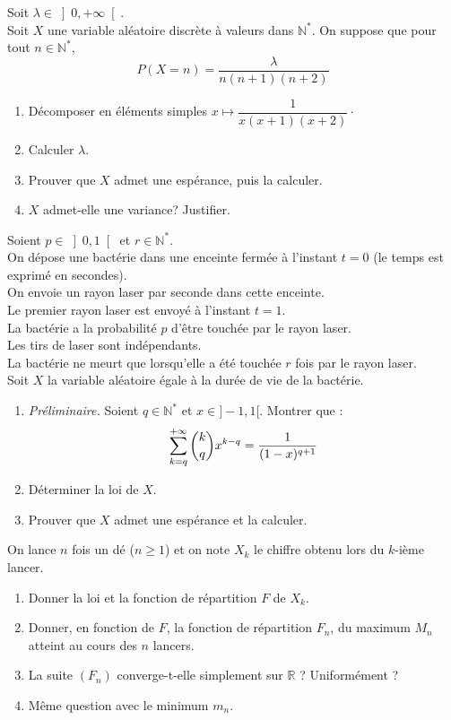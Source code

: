 \documentclass[a4paper,10pt]{report}
\begin{document}
\begin{Exa}Soit $\lambda \in{\left] 0,+\infty\right[ }$.\\
Soit $X$ une variable aléatoire discrète à valeurs dans $\mathbb{N}^\ast$. On suppose que pour tout $n \in \mathbb{N}^*$, 
$$P(X=n)=\dfrac{\lambda}{n(n+1)(n+2)} $$
\begin{enumerate}
\item Décomposer en éléments simples $x \mapsto \dfrac{1}{x(x+1)(x+2)} \cdot$
\item
Calculer $\lambda$.
\item
Prouver que $X$ admet une espérance, puis la calculer.
\item
$X$ admet-elle une variance? Justifier.
\end{enumerate}
\end{Exa}



\begin{Exa} Soient $p\in \left] 0,1\right[$ et $r\in\mathbb{N}^*$.\\
On dépose une bactérie dans une enceinte fermée à l'instant $t=0$ (le temps est exprimé en secondes).\\
On envoie un rayon laser par seconde dans cette enceinte.\\
Le premier rayon laser est envoyé à l'instant $t=1$.\\
La bactérie a la probabilité $p$ d'être touchée par le rayon laser.\\
Les tirs de laser sont indépendants.\\
La bactérie ne meurt que lorsqu'elle a été touchée $r$ fois par le rayon laser.\\
Soit $X$ la variable aléatoire égale à la durée de vie de la bactérie.\\
\begin{enumerate}
\item \textit{Préliminaire.} Soient $q \in \mathbb{N}^*$ et $x \in ]-1,1[$. Montrer que : 
$$ \sum\limits_{k=q}^{+\infty}\dbinom{k}{q}x^{k-q}=\dfrac{1}{(1-x)^{q+1}}$$
\item
Déterminer la loi de $X$.
\item
Prouver que $X$ admet une espérance et la calculer.
\end{enumerate}
\end{Exa}




\begin{Exa} On lance $n$ fois un dé ($n \geq 1$) et on note $X_k$ le chiffre obtenu lors du $k$-ième lancer.
\begin{enumerate}
\item Donner la loi et la fonction de répartition $F$ de $X_k$.
\item Donner, en fonction de $F$, la fonction de répartition $F_n$, du maximum $M_n$ atteint au cours des $n$ lancers.
\item La suite $(F_n)$ converge-t-elle simplement sur $\mathbb{R}$ ? Uniformément ?
\item Même question avec le minimum $m_n$.
\end{enumerate}
\end{Exa}
\end{document}
